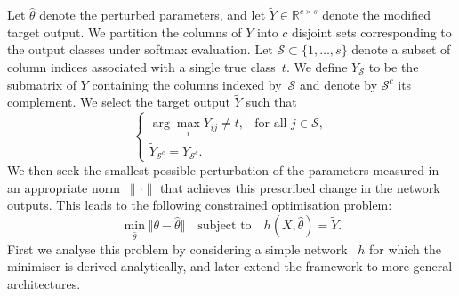 \documentclass{article}
\theoremstyle{plain}
\theoremstyle{definition}
\newtheorem{definition}[theorem]{Definition}
\theoremstyle{remark}
\begin{document}
Let $\hat{\theta}$ denote the perturbed parameters, and let $\tilde{Y}\in \mathbb{R}^{c \times s}$ denote the 
modified target output.
We partition the columns of $Y$ into $c$ disjoint sets corresponding to the output classes under softmax 
evaluation.
Let $\mathcal{S} \subset \{1,\ldots,s\}$ denote a subset of column indices associated with a single true class~$t$.
We define $Y_{\mathcal{S}}$ to be the submatrix of $Y$ containing the columns indexed by~$\mathcal{S}$ and denote 
by $\mathcal{S}^c$ its complement.
We select the target output $\tilde{Y}$ such that
\begin{equation}
\begin{cases}
\arg\max_i \tilde{Y}_{ij} \neq t, & \text{for all } j \in \mathcal{S}, \\
\tilde{Y}_{\mathcal{S}^c} = Y_{\mathcal{S}^c}.
\end{cases}
\end{equation}
We then seek the smallest possible perturbation of the parameters measured in an appropriate norm~$\|\cdot\|$ that achieves this prescribed change in the network outputs.  
This leads to the following constrained optimisation problem:
\begin{equation}\label{general}
\min_{\hat{\theta}} \Vert \theta - \hat{\theta} \Vert 
\quad \text{subject to} \quad 
h(X,\hat{\theta}) = \tilde{Y} .
\end{equation}
First we analyse this problem by considering a simple network ~$h$ for which the minimiser is derived analytically, and later extend the framework to more general architectures.



\end{document}
